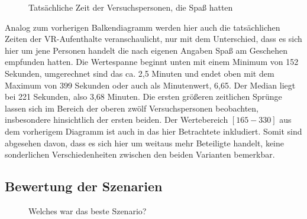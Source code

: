 \documentclass{Paper}
\begin{document}
                \begin{figure}[H]
  \caption{Tatsächliche Zeit der Versuchspersonen, die Spaß hatten}
  \label{ZeitSpass}
        \end{figure}
        Analog zum vorherigen Balkendiagramm werden hier auch die tatsächlichen Zeiten der VR-Aufenthalte veranschaulicht, nur mit dem Unterschied, dass es sich hier um jene Personen handelt die nach eigenen Angaben Spaß am Geschehen empfunden hatten.
Die Wertespanne beginnt unten mit einem Minimum von 152 Sekunden, umgerechnet sind das ca. 2,5 Minuten und endet oben mit dem Maximum von 399 Sekunden oder auch als Minutenwert, 6,65. Der Median liegt bei 221 Sekunden, also 3,68 Minuten. Die ersten größeren zeitlichen Sprünge lassen sich im Bereich der oberen zwölf Versuchspersonen beobachten, insbesondere hinsichtlich der ersten beiden. Der Wertebereich $[165-330]$ aus dem vorherigem Diagramm ist auch in das hier Betrachtete inkludiert. Somit sind abgesehen davon, dass es sich hier um weitaus mehr Beteiligte handelt, keine sonderlichen Verschiedenheiten zwischen den beiden Varianten bemerkbar.
       
\newpage

\subsection{Bewertung der Szenarien}
        \begin{figure}[ht]
\caption{Welches war das beste Szenario?}
\label{SzenarioGut}
\end{figure}
\end{document}
